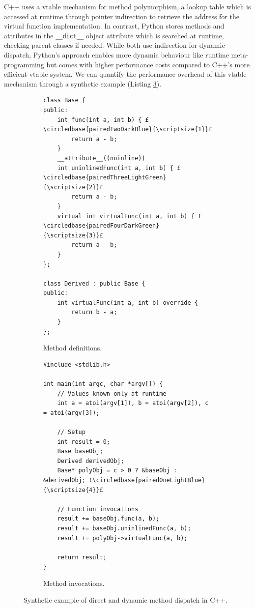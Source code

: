 C++ uses a \ac{vtable} mechanism for method polymorphism, a lookup table which is accessed at runtime through pointer indirection to retrieve the address for the virtual function implementation. In contrast, Python stores methods and attributes in the \texttt{__dict__} object attribute which is searched at runtime, checking parent classes if needed. While both use indirection for dynamic dispatch, Python's approach enables more dynamic behaviour like runtime meta-programming but comes with higher performance costs compared to C++'s more efficient \ac{vtable} system.
We can quantify the performance overhead of this \ac{vtable} mechanism through a synthetic example (Listing \ref{listing:impact-dispatch}).


\begin{figure}[H]
    \centering
    \begin{subfigure}[b]{0.45\textwidth}
       \centering
        \begin{verbatim}
class Base {
public:
    int func(int a, int b) { £\circledbase{pairedTwoDarkBlue}{\scriptsize{1}}£
        return a - b;
    }
    __attribute__((noinline))
    int uninlinedFunc(int a, int b) { £\circledbase{pairedThreeLightGreen}{\scriptsize{2}}£
        return a - b;
    }
    virtual int virtualFunc(int a, int b) { £\circledbase{pairedFourDarkGreen}{\scriptsize{3}}£
        return a - b;
    }
};

class Derived : public Base {
public:
    int virtualFunc(int a, int b) override {
        return b - a;
    }
};
        \end{verbatim}
        \scriptsize{\vspace{1em}}
        \captionsetup{name=Listing}
        \caption{Method definitions.}
        \label{listing:impact-dispatch-definition}
    \end{subfigure}
    \hfill
    \begin{subfigure}[b]{0.45\textwidth}
        \centering
        \begin{verbatim}
#include <stdlib.h>

int main(int argc, char *argv[]) {
    // Values known only at runtime
    int a = atoi(argv[1]), b = atoi(argv[2]), c = atoi(argv[3]);

    // Setup
    int result = 0;
    Base baseObj;
    Derived derivedObj;
    Base* polyObj = c > 0 ? &baseObj : &derivedObj; £\circledbase{pairedOneLightBlue}{\scriptsize{4}}£

    // Function invocations
    result += baseObj.func(a, b);
    result += baseObj.uninlinedFunc(a, b);
    result += polyObj->virtualFunc(a, b);

    return result;
}
        \end{verbatim}
        \captionsetup{name=Listing}
        \caption{Method invocations.}
        \label{listing:impact-dispatch-invocation}
    \end{subfigure}
    \vspace{1em}
    \captionsetup{name=Listing}
    \caption{Synthetic example of direct and dynamic method dispatch in C++.}
    \label{listing:impact-dispatch}
\end{figure}

